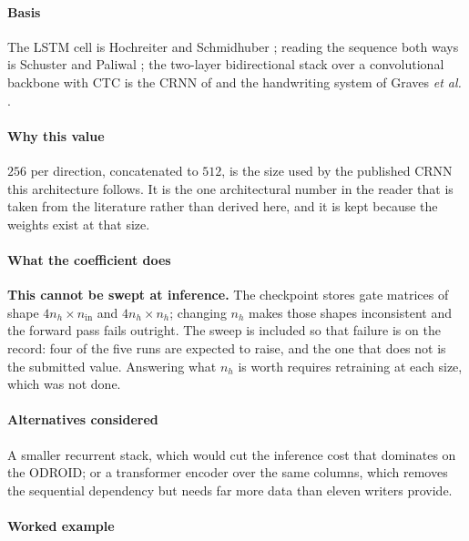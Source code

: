 \paragraph{Basis}

The LSTM cell is Hochreiter and Schmidhuber \cite{hochreiter1997}; reading the sequence both ways is Schuster and Paliwal \cite{schuster1997}; the two-layer bidirectional stack over a convolutional backbone with CTC is the CRNN of \cite[p.~2298]{shi2017} and the handwriting system of Graves \textit{et al.} \cite[p.~855]{graves2009}.

\paragraph{Why this value}

$256$ per direction, concatenated to $512$, is the size used by the published CRNN this architecture follows. It is the one architectural number in the reader that is taken from the literature rather than derived here, and it is kept because the weights exist at that size.

\paragraph{What the coefficient does}

\textbf{This cannot be swept at inference.} The checkpoint stores gate matrices of shape $4n_h \times n_{\text{in}}$ and $4n_h \times n_h$; changing $n_h$ makes those shapes inconsistent and the forward pass fails outright. The sweep is included so that failure is on the record: four of the five runs are expected to raise, and the one that does not is the submitted value. Answering what $n_h$ is worth requires retraining at each size, which was not done.

\paragraph{Alternatives considered}

A smaller recurrent stack, which would cut the inference cost that dominates on the ODROID; or a transformer encoder over the same columns, which removes the sequential dependency but needs far more data than eleven writers provide.

\paragraph{Worked example}

